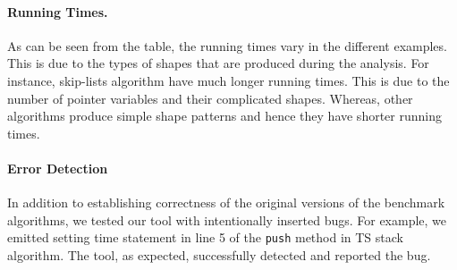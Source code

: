 %
%



\paragraph{Running Times.}
As can be seen from the table, the running times
vary in the different examples.
%
This is due to the types of shapes that are produced during the analysis.
%
For instance, skip-lists algorithm have much longer running times. This is due to 
the number of pointer variables and their complicated shapes. Whereas, other algorithms 
produce simple shape patterns and hence they have shorter running times.
\paragraph{Error Detection}
 In addition to establishing correctness of the original versions of the
benchmark algorithms, we tested our tool with intentionally inserted bugs. For example, we emitted setting time statement in line 5 of the {\tt push} method in TS stack algorithm. The tool, as expected, successfully detected and reported the bug.
 



